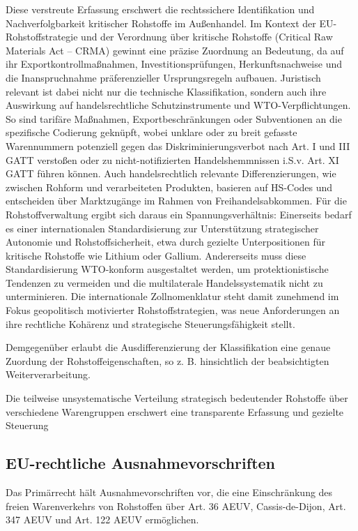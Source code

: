 \documentclass[12pt,a4paper,oneside]{book} %
\begin{document}
Diese verstreute Erfassung erschwert die rechtssichere Identifikation und Nachverfolgbarkeit kritischer Rohstoffe im Außenhandel. Im Kontext der EU-Rohstoffstrategie und der Verordnung über kritische Rohstoffe (Critical Raw Materials Act – CRMA) gewinnt eine präzise Zuordnung an Bedeutung, da auf ihr Exportkontrollmaßnahmen, Investitionsprüfungen, Herkunftsnachweise und die Inanspruchnahme präferenzieller Ursprungsregeln aufbauen. Juristisch relevant ist dabei nicht nur die technische Klassifikation, sondern auch ihre Auswirkung auf handelsrechtliche Schutzinstrumente und WTO-Verpflichtungen. So sind tarifäre Maßnahmen, Exportbeschränkungen oder Subventionen an die spezifische Codierung geknüpft, wobei unklare oder zu breit gefasste Warennummern potenziell gegen das Diskriminierungsverbot nach Art. I und III GATT verstoßen oder zu nicht-notifizierten Handelshemmnissen i.S.v. Art. XI GATT führen können. Auch handelsrechtlich relevante Differenzierungen, wie zwischen Rohform und verarbeiteten Produkten, basieren auf HS-Codes und entscheiden über Marktzugänge im Rahmen von Freihandelsabkommen. Für die Rohstoffverwaltung ergibt sich daraus ein Spannungsverhältnis: Einerseits bedarf es einer internationalen Standardisierung zur Unterstützung strategischer Autonomie und Rohstoffsicherheit, etwa durch gezielte Unterpositionen für kritische Rohstoffe wie Lithium oder Gallium. Andererseits muss diese Standardisierung WTO-konform ausgestaltet werden, um protektionistische Tendenzen zu vermeiden und die multilaterale Handelssystematik nicht zu unterminieren. Die internationale Zollnomenklatur steht damit zunehmend im Fokus geopolitisch motivierter Rohstoffstrategien, was neue Anforderungen an ihre rechtliche Kohärenz und strategische Steuerungsfähigkeit stellt.

Demgegenüber erlaubt die Ausdifferenzierung der Klassifikation eine genaue Zuordung der Rohstoffeigenschaften, so z. B. hinsichtlich der beabsichtigten Weiterverarbeitung.\autocite{Schorkopf, Rohstoffverwaltung, Rn. 8.}

Die teilweise unsystematische Verteilung strategisch bedeutender Rohstoffe über verschiedene Warengruppen erschwert eine transparente Erfassung und gezielte Steuerung

\subsection{EU-rechtliche Ausnahmevorschriften}

Das Primärrecht hält Ausnahmevorschriften vor, die eine Einschränkung des freien Warenverkehrs von Rohstoffen über Art. 36 AEUV, Cassis-de-Dijon, Art. 347 AEUV und Art. 122 AEUV ermöglichen.\autocite{Schorkopf, Rohstoffverwaltung, Rn. 10}
\end{document}
